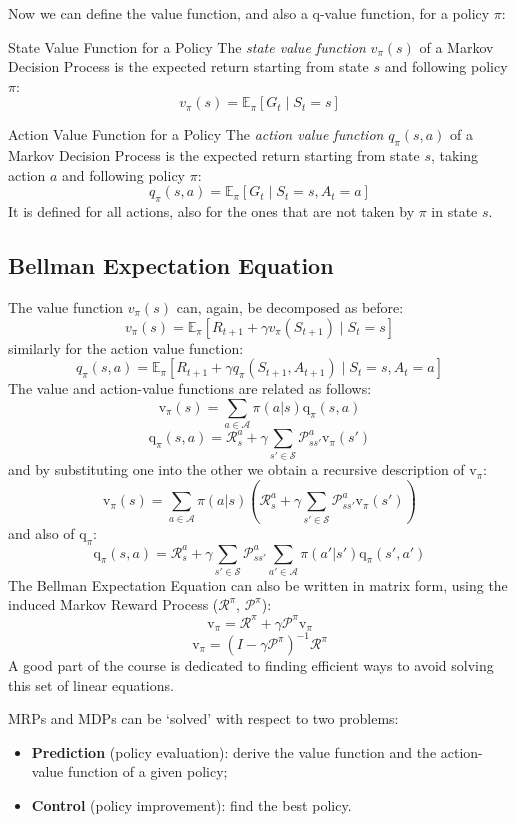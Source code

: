 Now we can define the value function, and also a q-value function, for a policy $\pi$:
\begin{defbox}{State Value Function for a Policy}
    The \textit{state value function} $v_\pi(s)$ of a Markov Decision Process is the expected return starting from state $s$ and following policy $\pi$:
    \[v_\pi(s)=\mathbb{E}_\pi[G_t\mid S_t=s]\]
\end{defbox}
\begin{defbox}{Action Value Function for a Policy}
    The \textit{action value function} $q_\pi(s, a)$ of a Markov Decision Process is the expected return starting from state $s$, taking action $a$ and following policy $\pi$:
    \[q_\pi(s, a)=\mathbb{E}_\pi[G_t\mid S_t=s, A_t=a]\]
    It is defined for all actions, also for the ones that are not taken by $\pi$ in state $s$.
\end{defbox}

\subsection{Bellman Expectation Equation}
The value function $v_{\pi}(s)$ can, again, be decomposed as before:
\[v_\pi(s) = \mathbb{E}_\pi[R_{t+1} + \gamma v_\pi(S_{t+1}) \mid S_t = s]\]
similarly for the action value function:
\[q_\pi(s, a) = \mathbb{E}_\pi[R_{t+1} + \gamma q_\pi(S_{t+1}, A_{t+1}) \mid S_t = s, A_t = a]\]
The value and action-value functions are related as follows:
\[\mathrm{v}_\pi(s)=\sum_{a\in \mathcal{A}}\pi(a|s)\mathrm{q}_\pi(s,a)\]
\[\mathrm{q}_\pi(s,a)=\mathcal{R}_s^a+\gamma\sum_{s'\in \mathcal{S}}\mathcal{P}_{ss'}^a\mathrm{v}_\pi(s')\]
and by substituting one into the other we obtain a recursive description of $\mathrm{v}_\pi$:
\[\mathrm{v}_\pi(s)=\sum_{a\in \mathcal{A}}\pi(a|s)\left(\mathcal{R}_s^a+\gamma\sum_{s'\in \mathcal{S}}\mathcal{P}_{ss'}^a\mathrm{v}_\pi(s')\right)\]
and also of $\mathrm{q}_\pi$:
\[\mathrm{q}_\pi(s,a)=\mathcal{R}_s^a+\gamma\sum_{s'\in \mathcal{S}}\mathcal{P}_{ss'}^a\sum_{a'\in \mathcal{A}}\pi(a'|s')\mathrm{q}_\pi(s',a')\]
The Bellman Expectation Equation can also be written in matrix form, using the induced Markov Reward Process ($\mathcal{R}^\pi$, $\mathcal{P}^\pi$):
\[\mathrm{v}_\pi=\mathcal{R}^\pi+\gamma\mathcal{P}^\pi\mathrm{v}_\pi\]
\[\mathrm{v}_\pi=(I-\gamma\mathcal{P}^\pi)^{-1}\mathcal{R}^\pi\]
A good part of the course is dedicated to finding efficient ways to avoid solving this set of linear equations.

MRPs and MDPs can be `solved' with respect to two problems:
\begin{itemize}
    \item \textbf{Prediction} (policy evaluation): derive the value function and the action-value function of a given policy;
    \item \textbf{Control} (policy improvement): find the best policy.
\end{itemize}
